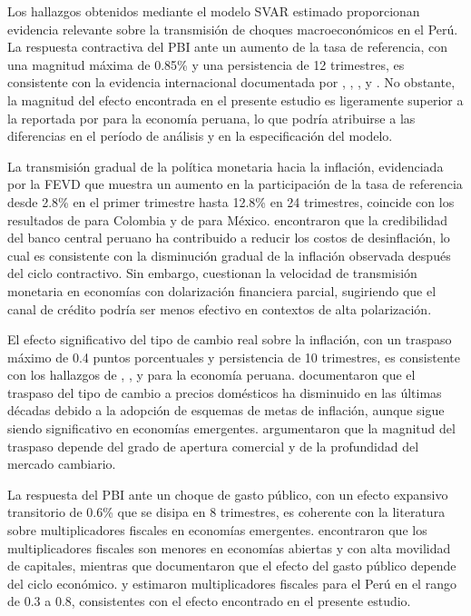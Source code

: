 \documentclass[12pt,a4paper]{article}
\begin{document}
Los hallazgos obtenidos mediante el modelo SVAR estimado proporcionan evidencia relevante sobre la transmisión de choques macroeconómicos en el Perú. La respuesta contractiva del PBI ante un aumento de la tasa de referencia, con una magnitud máxima de 0.85\% y una persistencia de 12 trimestres, es consistente con la evidencia internacional documentada por \citet{christiano1999}, \citet{bernanke1992}, \citet{sims1992}, \citet{walsh2010} y \citet{woodford2003}. No obstante, la magnitud del efecto encontrada en el presente estudio es ligeramente superior a la reportada por \citet{castillo2018} para la economía peruana, lo que podría atribuirse a las diferencias en el período de análisis y en la especificación del modelo.

La transmisión gradual de la política monetaria hacia la inflación, evidenciada por la FEVD que muestra un aumento en la participación de la tasa de referencia desde 2.8\% en el primer trimestre hasta 12.8\% en 24 trimestres, coincide con los resultados de \citet{restrepo2015} para Colombia y de \citet{chiquiar2016} para México. \citet{winkelried2016} encontraron que la credibilidad del banco central peruano ha contribuido a reducir los costos de desinflación, lo cual es consistente con la disminución gradual de la inflación observada después del ciclo contractivo. Sin embargo, \citet{lahura2021} cuestionan la velocidad de transmisión monetaria en economías con dolarización financiera parcial, sugiriendo que el canal de crédito podría ser menos efectivo en contextos de alta polarización.

El efecto significativo del tipo de cambio real sobre la inflación, con un traspaso máximo de 0.4 puntos porcentuales y persistencia de 10 trimestres, es consistente con los hallazgos de \citet{llontop2019}, \citet{rojas2020}, \citet{mendoza2022} y \citet{humala2023} para la economía peruana. \citet{caporale2018} documentaron que el traspaso del tipo de cambio a precios domésticos ha disminuido en las últimas décadas debido a la adopción de esquemas de metas de inflación, aunque sigue siendo significativo en economías emergentes. \citet{defrancisco2017} argumentaron que la magnitud del traspaso depende del grado de apertura comercial y de la profundidad del mercado cambiario.

La respuesta del PBI ante un choque de gasto público, con un efecto expansivo transitorio de 0.6\% que se disipa en 8 trimestres, es coherente con la literatura sobre multiplicadores fiscales en economías emergentes. \citet{perotti2004} encontraron que los multiplicadores fiscales son menores en economías abiertas y con alta movilidad de capitales, mientras que \citet{favero2005} documentaron que el efecto del gasto público depende del ciclo económico. \citet{cespedes2020} y \citet{fernandez2024} estimaron multiplicadores fiscales para el Perú en el rango de 0.3 a 0.8, consistentes con el efecto encontrado en el presente estudio.
\end{document}
